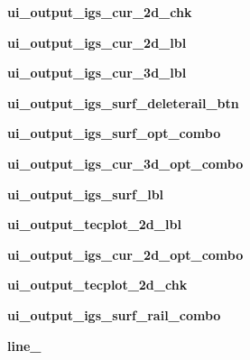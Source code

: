 \begin{DoxyCompactItemize}
\item 
\hypertarget{a00077_ab532154d6273918060a4d4ef92599e20}{}\label{a00077_ab532154d6273918060a4d4ef92599e20} 
{\bfseries ui\+\_\+output\+\_\+igs\+\_\+cur\+\_\+2d\+\_\+chk}
\item 
\hypertarget{a00077_a56d9b0f2bb1161b50e6cd020b28106b2}{}\label{a00077_a56d9b0f2bb1161b50e6cd020b28106b2} 
{\bfseries ui\+\_\+output\+\_\+igs\+\_\+cur\+\_\+2d\+\_\+lbl}
\item 
\hypertarget{a00077_a47a1df1f89ca935117346098ed96fd98}{}\label{a00077_a47a1df1f89ca935117346098ed96fd98} 
{\bfseries ui\+\_\+output\+\_\+igs\+\_\+cur\+\_\+3d\+\_\+lbl}
\item 
\hypertarget{a00077_a5b1e25fc04ca17a3a8d6fbad21981539}{}\label{a00077_a5b1e25fc04ca17a3a8d6fbad21981539} 
{\bfseries ui\+\_\+output\+\_\+igs\+\_\+surf\+\_\+deleterail\+\_\+btn}
\item 
\hypertarget{a00077_a42e57cade8b6c21d81aeee2be06bb581}{}\label{a00077_a42e57cade8b6c21d81aeee2be06bb581} 
{\bfseries ui\+\_\+output\+\_\+igs\+\_\+surf\+\_\+opt\+\_\+combo}
\item 
\hypertarget{a00077_ad689a6c3856be67dc806b3334f032fb6}{}\label{a00077_ad689a6c3856be67dc806b3334f032fb6} 
{\bfseries ui\+\_\+output\+\_\+igs\+\_\+cur\+\_\+3d\+\_\+opt\+\_\+combo}
\item 
\hypertarget{a00077_afdd12bfad9e3808e8f183f9c5c1a7083}{}\label{a00077_afdd12bfad9e3808e8f183f9c5c1a7083} 
{\bfseries ui\+\_\+output\+\_\+igs\+\_\+surf\+\_\+lbl}
\item 
\hypertarget{a00077_a33a702cecbba7090c938c1eabfd57669}{}\label{a00077_a33a702cecbba7090c938c1eabfd57669} 
{\bfseries ui\+\_\+output\+\_\+tecplot\+\_\+2d\+\_\+lbl}
\item 
\hypertarget{a00077_aead15c2fb2cb4c70becfc3f7f5dc96bf}{}\label{a00077_aead15c2fb2cb4c70becfc3f7f5dc96bf} 
{\bfseries ui\+\_\+output\+\_\+igs\+\_\+cur\+\_\+2d\+\_\+opt\+\_\+combo}
\item 
\hypertarget{a00077_a8f3110a97b17d4203ce917f6256fea2b}{}\label{a00077_a8f3110a97b17d4203ce917f6256fea2b} 
{\bfseries ui\+\_\+output\+\_\+tecplot\+\_\+2d\+\_\+chk}
\item 
\hypertarget{a00077_a409bbf4eb732237d4d562061912c2f01}{}\label{a00077_a409bbf4eb732237d4d562061912c2f01} 
{\bfseries ui\+\_\+output\+\_\+igs\+\_\+surf\+\_\+rail\+\_\+combo}
\item 
\hypertarget{a00077_a1a185947c45f1883377113ae7bb13bf3}{}\label{a00077_a1a185947c45f1883377113ae7bb13bf3} 
{\bfseries line\+\_}
\item 

\end{DoxyCompactItemize}
